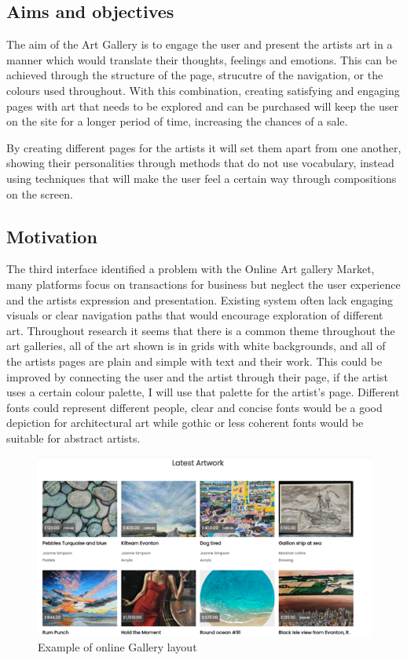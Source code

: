 \documentclass[]{project_final}
\begin{document}
\subsection{Aims and objectives}
The aim of the Art Gallery is to engage the user and present the artists art in a manner which would translate their thoughts, feelings and emotions. This can be achieved through the structure of the page, strucutre of the navigation, or the colours used throughout. With this combination, creating satisfying and engaging pages with art that needs to be explored and can be purchased will keep the user on the site for a longer period of time, increasing the chances of a sale.

By creating different pages for the artists it will set them apart from one another, showing their personalities through methods that do not use vocabulary, instead using techniques that will make the user feel a certain way through compositions on the screen.
\subsection{Motivation}
The third interface identified a problem with the Online Art gallery Market, many platforms focus on transactions for business but neglect the user experience and the artists expression and presentation. Existing system often lack engaging visuals or clear navigation paths that would encourage exploration of different art.
Throughout research it seems that there is a common theme throughout the art galleries, all of the art shown is in grids with white backgrounds, and all of the artists pages are plain and simple with text and their work. This could be improved by connecting the user and the artist through their page, if the artist uses a certain colour palette, I will use that palette for the artist’s page. Different fonts could represent different people, clear and concise fonts would be a good depiction for architectural art while gothic or less coherent fonts would be suitable for abstract artists.

\begin{figure}[ht!]
  \centering
  \includegraphics{artGalleryGrid.png}
  \vspace*{0.0cm}
  \caption{Example of online Gallery layout}
  \label{fig:1}
\end{figure}
\end{document}
